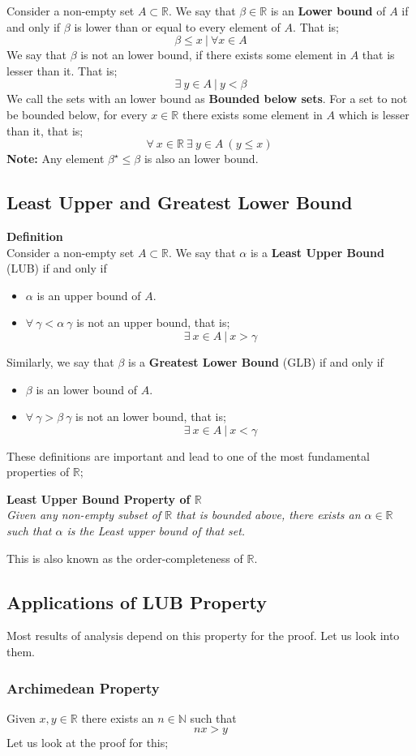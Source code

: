 \documentclass[english,course]{lecture}
\begin{document}
Consider a non-empty set $A \subset \mathbb{R}$. We say that $\beta \in \mathbb{R}$ is an \textbf{Lower bound} of $A$ if and only if $\beta$ is lower than or equal to every element of $A$. That is;
$$ \beta \leq x \ | \ \forall x \in A $$
We say that $\beta$ is not an lower bound, if there exists some element in $A$ that is lesser than it. That is;
$$ \exists \ y \in A \ | \ y < \beta $$
We call the sets with an lower bound as \textbf{Bounded below sets}. For a set to not be bounded below, for every $x \in \mathbb{R}$ there exists some element in $A$ which is lesser than it, that is;
$$ \forall \ x \in \mathbb{R} \ \exists \ y \in A \ (y \leq x) \ $$
\textbf{Note:}
Any element $\beta^{\star} \leq \beta$ is also an lower bound.

\subsection{Least Upper and Greatest Lower Bound}
\textbf{Definition} \\
Consider a non-empty set $A \subset \mathbb{R}$. We say that $\alpha$ is a \textbf{Least Upper Bound} (LUB) if and only if 
\begin{itemize}
\item $\alpha$ is an upper bound of $A$.
\item $\forall \ \gamma < \alpha \ \gamma$ is not an upper bound, that is;
$$ \exists \ x \in A \ | \ x > \gamma$$
\end{itemize}
Similarly, we say that $\beta$ is a \textbf{Greatest Lower Bound} (GLB) if and only if 
\begin{itemize}
\item $\beta$ is an lower bound of $A$.
\item $\forall \ \gamma > \beta \ \gamma$ is not an lower bound, that is;
$$ \exists \ x \in A \ | \ x < \gamma$$
\end{itemize}

These definitions are important and lead to one of the most fundamental properties of $\mathbb{R}$;
\begin{center}
\textbf{Least Upper Bound Property of $\mathbb{R}$} \\
\emph{Given any non-empty subset of $\mathbb{R}$ that is bounded above, there exists an $\alpha \in \mathbb{R}$ such that $\alpha$ is the Least upper bound of that set.}
\end{center}
This is also known as the order-completeness of $\mathbb{R}$.

\subsection{Applications of LUB Property}
Most results of analysis depend on this property for the proof. Let us look into them.

\subsubsection{Archimedean Property}
Given $x,y \in \mathbb{R}$ there exists an $n \in \mathbb{N}$ such that 
$$ nx > y $$
Let us look at the proof for this;
\end{document}
